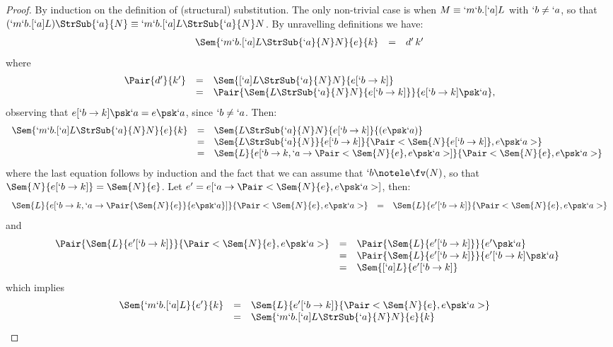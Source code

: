 \documentclass{lmcs}
\begin{document}
 \begin{proof}
By induction on the definition of (structural) substitution.
The only non-trivial case is when $M \equiv `m `b. [`a]L$ with $`b \neq `a$, so that $(`m `b. [`a]L)\StrSub{`a}{N} \equiv `m`b.[`a]L\StrSub{`a}{N} N$.
By unravelling definitions we have:
%
 \[ \begin{array}{rcl}
 \Sem{ `m`b.[`a]L\StrSub{`a}{N} N }{ e }{ k } 
	&=& 
d'\, k'
 \end{array} \]
where
%
 \[ \begin{array}{rcl}
 \Pair{d' }{ k' } 
	&=& 
 \Sem{ [`a]L\StrSub{`a}{N} N }{ e[`b \to k]} \\
	&=& 
 \Pair{\Sem{ L\StrSub{`a}{N} N }{ e[`b \to k]} }{ e[`b \to k] \psk `a},
 \end{array} \]
observing that $e[`b \to k] \psk `a = e\psk`a$, since $`b \neq `a$. 
Then:
%
 \[ \begin{array}{rcl@{\quad}l}
\Sem{ `m`b.[`a]L\StrSub{`a}{N} N }{ e }{ k } & = & 
\Sem{ L\StrSub{`a}{N} N }{ e[`b \to k] }{ (e\psk `a) } \\ & = & 
\Sem{ L\StrSub{`a}{N} }{ e[`b \to k] }{ \Pair<\Sem{ N }{ e [`b \to k] } , e\psk`a > } \\ & = &
\Sem{ L }{ e[`b \to k, `a \to \Pair<\Sem{ N }{ e } , e\psk`a > ] }{ \Pair<\Sem{ N }{ e } , e\psk`a > }
 \end{array} \]
where the last equation follows by induction and the fact that we can assume that $`b\notele \fv(N)$, so that $\Sem{ N }{ e[`b \to k] } = \Sem{ N }{ e } $. 
Let $e' = e[`a \to \Pair<\Sem{ N }{ e } , e\psk`a >]$, then:
%
 \[ \begin{array}{rcl}
 \Sem{L}{ e[`b \to k, `a \to \Pair{\Sem{ N }{ e } }{ e\psk`a }] }{ \Pair<\Sem{ N }{ e } , e\psk`a > } &=&
 \Sem{ L }{ e'[`b \to k]}{\Pair<\Sem{ N }{ e } , e\psk`a >}
 \end{array} \]
and
%
 \[ \begin{array}{rcl@{\quad}l}
 \Pair{\Sem{L}{ e'[`b \to k] } }{ \Pair<\Sem{ N }{ e } , e\psk`a > } 
	& = & 
\Pair{\Sem{ L }{ e'[`b \to k] } }{ e'\psk `a} 
	\\ & = & 
\Pair{\Sem{ L }{ e'[`b \to k] } }{ e'[`b \to k]\psk `a} 
	\\ & = & 
\Sem{ [`a]L}{e'[`b \to k]}
 \end{array} \]
which implies
 \[ \begin{array}{@{}rcl@{\quad}lc@{}}
 \Sem{ `m `b. [`a]L }{ e' }{ k } 
	&=& 
 \Sem{ L }{ e'[`b \to k] }{ \Pair<\Sem{ N }{ e } , e\psk`a > } \\
	&=& 
 \Sem{ `m`b.[`a]L\StrSub{`a}{N} N }{ e }{ k } 
 \end{array} \]
\arrayqed[-20pt]
 \end{proof}
\end{document}
